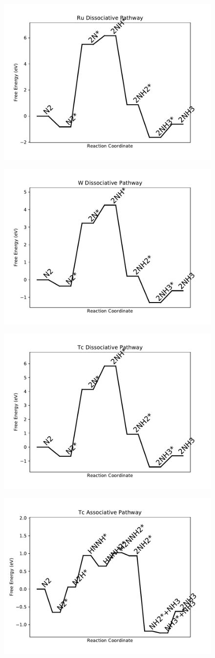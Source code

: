 \documentclass[journal=jacsat,manuscript=article]{achemso}
\begin{document}
\begin{figure}
\includegraphics[width=0.5\linewidth]{data/plots/Ru_dissociative.pdf}
\label{fig:Ru_dissociative}
\end{figure}

\begin{figure}
\includegraphics[width=0.5\linewidth]{data/plots/W_dissociative.pdf}
\label{fig:W_dissociative}
\end{figure}

\begin{figure}
\includegraphics[width=0.5\linewidth]{data/plots/Tc_dissociative.pdf}
\label{fig:Tc_dissociative}
\end{figure}

\begin{figure}
\includegraphics[width=0.5\linewidth]{data/plots/Tc_associative.pdf}
\label{fig:Tc_associative}
\end{figure}
\end{document}
